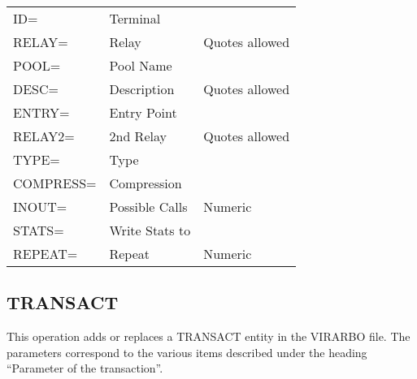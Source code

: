 \documentclass[letterpaper,10pt,english]{sphinxmanual}
\begin{document}
\begin{savenotes}\sphinxattablestart
\centering
\begin{tabulary}{\linewidth}[t]{|T|T|T|}
\hline
{}\relax &\relax &\relax \\
\hline
ID=
&
Terminal
&\\
\hline
RELAY=
&
Relay
&
Quotes allowed
\\
\hline
POOL=
&
Pool Name
&\\
\hline
DESC=
&
Description
&
Quotes allowed
\\
\hline
ENTRY=
&
Entry Point
&\\
\hline
RELAY2=
&
2nd Relay
&
Quotes allowed
\\
\hline
TYPE=
&
Type
&\\
\hline
COMPRESS=
&
Compression
&\\
\hline
INOUT=
&
Possible Calls
&
Numeric
\\
\hline
STATS=
&
Write Stats to
&\\
\hline
REPEAT=
&
Repeat
&
Numeric
\\
\hline
\end{tabulary}
\par
\sphinxattableend\end{savenotes}


\subsection{TRANSACT}
\label{\detokenize{Installation_Guide:transact}}\label{\detokenize{Installation_Guide:index-174}}
This operation adds or replaces a TRANSACT entity in the VIRARBO file. The parameters correspond to the various items described under the heading “Parameter of the transaction”.
\end{document}
